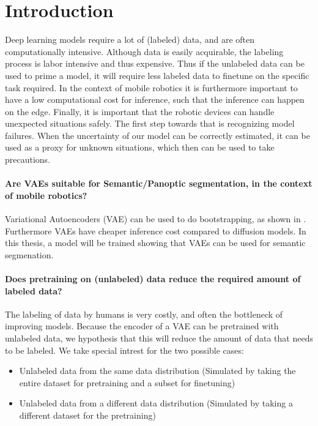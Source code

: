 \chapter{Introduction}\label{chapter:introduction}

Deep learning models require a lot of (labeled) data, and are often computationally intensive. Although data is easily acquirable, the labeling process is labor intensive and thus expensive. Thus if the unlabeled data can be used to prime a model, it will require less labeled data to finetune on the specific task required. In the context of mobile robotics it is furthermore important to have a low computational cost for inference, such that the inference can happen on the edge. Finally, it is important that the robotic devices can handle unexpected situations safely. The first step towards that is recognizing model failures. When the uncertainty of our model can be correctly estimated, it can be used as a proxy for unknown situations, which then can be used to take precautions.

\subsubsection*{Are VAEs suitable for Semantic/Panoptic segmentation, in the context of mobile robotics?}
Variational Autoencoders (VAE) can be used to do bootstrapping, as shown in \cite{kohl2018probabilistic}. Furthermore VAEs have cheaper inference cost compared to diffusion models. In this thesis, a model will be trained showing that VAEs can be used for semantic segmenation.

\subsubsection*{Does pretraining on (unlabeled) data reduce the required amount of labeled data?}
The labeling of data by humans is very costly, and often the bottleneck of improving models. Because the encoder of a VAE can be pretrained with unlabeled data, we hypothesis that this will reduce the amount of data that needs to be labeled. We take special intrest for the two possible cases:
\begin{itemize}
    \item Unlabeled data from the same data distribution (Simulated by taking the entire dataset for pretraining and a subset for finetuning)
    \item Unlabeled data from a different data distribution (Simulated by taking a different dataset for the pretraining)
\end{itemize}
